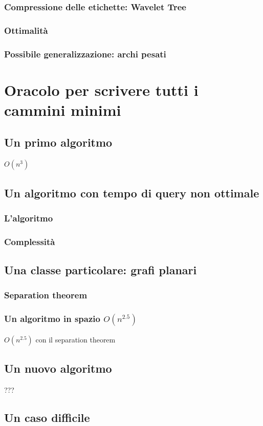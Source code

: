 \documentclass[a4paper,10pt]{amsbook}
\theoremstyle{plain}
\theoremstyle{definition}
\theoremstyle{remark}
\begin{document}
\subsection{Compressione delle etichette: Wavelet Tree}

\subsection{Ottimalità}

\subsection{Possibile generalizzazione: archi pesati}


\chapter{Oracolo per scrivere tutti i cammini minimi}
\label{chap:oracolotutticammini}

\section{Un primo algoritmo}

$O(n^3)$

\section{Un algoritmo con tempo di query non ottimale}

\subsection{L'algoritmo}

\subsection{Complessità}

\section{Una classe particolare: grafi planari}

\subsection{Separation theorem}

\subsection{Un algoritmo in spazio $O(n^{2.5})$}

$O(n^{2.5})$ con il separation theorem

\section{Un nuovo algoritmo}

???

\section{Un caso difficile}





\end{document}
